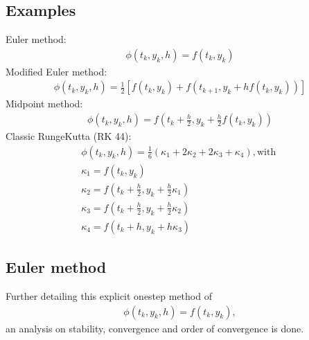 \documentclass[letterpaper,10pt,english]{jupyterBook}
\begin{document}
\subsection{Examples}
\label{\detokenize{cap2:examples}}
\sphinxAtStartPar
Euler method:
\begin{equation*}
\begin{split}
    \phi (t_{k},y_{k},h) = f(t_{k},y_{k})
\end{split}
\end{equation*}
\sphinxAtStartPar
Modified Euler method:
\begin{equation*}
\begin{split}
    \phi (t_{k},y_{k},h) = \frac{1}{2} \left[ f(t_{k},y_{k}) + f(t_{k+1},y_{k} + h f(t_{k},y_{k})) \right]
\end{split}
\end{equation*}
\sphinxAtStartPar
Midpoint method:
\begin{equation*}
\begin{split}
    \phi (t_{k},y_{k},h) = f(t_{k} + \frac{h}{2},y_{k} + \frac{h}{2} f(t_{k},y_{k}))
\end{split}
\end{equation*}
\sphinxAtStartPar
Classic Runge\sphinxhyphen{}Kutta (RK 4\sphinxhyphen{}4):
\begin{equation*}
\begin{split}
    \phi (t_{k},y_{k},h) = \frac{1}{6} \left( \kappa_1 + 2 \kappa_2 + 2 \kappa_3 + \kappa_4 \right), \text{with }\\
    \kappa_1 = f(t_{k},y_{k})\\
    \kappa_2 = f(t_{k} + \frac{h}{2},y_{k} + \frac{h}{2} \kappa_1)\\
    \kappa_3 = f(t_{k} + \frac{h}{2},y_{k} + \frac{h}{2} \kappa_2)\\
    \kappa_4 = f(t_{k} + h, y_{k} + h \kappa_3)
\end{split}
\end{equation*}

\subsection{Euler method}
\label{\detokenize{cap2:euler-method}}
\sphinxAtStartPar
Further detailing this explicit one\sphinxhyphen{}step method of
\begin{equation*}
\begin{split}
    \phi (t_{k},y_{k},h) = f(t_{k},y_{k}),
\end{split}
\end{equation*}
\sphinxAtStartPar
an analysis on stability, convergence and order of convergence is done.
\end{document}
